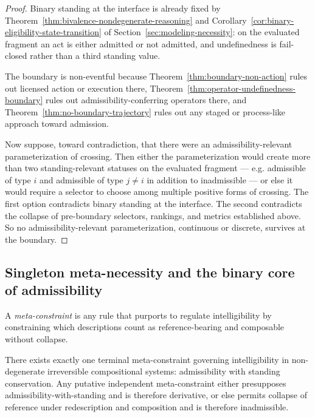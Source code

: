 \begin{proof}
Binary standing at the interface is already fixed by Theorem~\ref{thm:bivalence-nondegenerate-reasoning} and Corollary~\ref{cor:binary-eligibility-state-transition} of Section~\ref{sec:modeling-necessity}: on the evaluated fragment an act is either admitted or not admitted, and undefinedness is fail-closed rather than a third standing value.

The boundary is non-eventful because Theorem~\ref{thm:boundary-non-action} rules out licensed action or execution there, Theorem~\ref{thm:operator-undefinedness-boundary} rules out admissibility-conferring operators there, and Theorem~\ref{thm:no-boundary-trajectory} rules out any staged or process-like approach toward admission.

Now suppose, toward contradiction, that there were an admissibility-relevant parameterization of crossing. Then either the parameterization would create more than two standing-relevant statuses on the evaluated fragment --- e.g. admissible of type $i$ and admissible of type $j\neq i$ in addition to inadmissible --- or else it would require a selector to choose among multiple positive forms of crossing. The first option contradicts binary standing at the interface. The second contradicts the collapse of pre-boundary selectors, rankings, and metrics established above. So no admissibility-relevant parameterization, continuous or discrete, survives at the boundary.\cite{MaleyAMetric,MaleyNecessity}
\end{proof}

\subsection{Singleton meta-necessity and the binary core of admissibility}

\begin{definition}
A \emph{meta-constraint} is any rule that purports to regulate intelligibility by constraining which descriptions count as reference-bearing and composable without collapse.
\end{definition}

\begin{theorem}
\label{thm:singleton-meta-necessity}
There exists exactly one terminal meta-constraint governing intelligibility in non-degenerate irreversible compositional systems: admissibility with standing conservation. Any putative independent meta-constraint either presupposes admissibility-with-standing and is therefore derivative, or else permits collapse of reference under redescription and composition and is therefore inadmissible.
\end{theorem}

